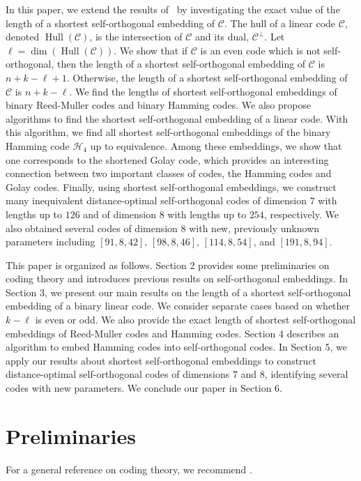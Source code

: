 \documentclass{article}
\theoremstyle{definition}
\theoremstyle{remark}
\newcommand{\Hull}{\operatorname{Hull}}
\begin{document}
In this paper, we extend the results of~\cite{Kim2022} by investigating the exact value of the length of a shortest self-orthogonal embedding of $\mathcal{C}$. The hull of a linear code $\mathcal{C}$, denoted $\Hull(\mathcal{C})$, is the intersection of $\mathcal{C}$ and its dual, $\mathcal{C}^\perp$.  Let $\ell = \dim(\Hull(\mathcal{C}))$.  We show that if $\mathcal{C}$ is an even code which is not self-orthogonal, then the length of a shortest self-orthogonal embedding of $\mathcal{C}$ is $n+k-\ell+1$. Otherwise, the length of a shortest self-orthogonal embedding of $\mathcal{C}$ is $n+k-\ell$. We find the lengths of shortest self-orthogonal embeddings of binary Reed-Muller codes and binary Hamming codes. We also propose algorithms to find the shortest self-orthogonal embedding of a linear code. With this algorithm, we find all shortest self-orthogonal embeddings of the binary Hamming code $\mathcal{H}_4$ up to equivalence. Among these embeddings, we show that one corresponds to the shortened Golay code, which provides an interesting connection between two important classes of codes, the Hamming codes and Golay codes. Finally, using shortest self-orthogonal embeddings, we construct many inequivalent distance-optimal self-orthogonal codes of dimension $7$ with lengths up to $126$ and of dimension $8$ with lengths up to $254$, respectively. We also obtained several codes of dimension $8$ with new, previously unknown parameters including $[91, 8, 42],\, [98, 8, 46],\,[114, 8, 54]$, and $[191, 8, 94]$.

This paper is organized as follows. Section 2 provides some preliminaries on coding theory and introduces previous results on self-orthogonal embeddings. In Section 3, we present our main results on the length of a shortest self-orthogonal embedding of a binary linear code. We consider separate cases based on whether $k-\ell$ is even or odd. We also provide the exact length of shortest self-orthogonal embeddings of Reed-Muller codes and Hamming codes. Section 4 describes an algorithm to embed Hamming codes into self-orthogonal codes. In Section 5, we apply our results about shortest self-orthogonal embeddings to construct distance-optimal self-orthogonal codes of dimensions $7$ and $8$, identifying several codes with new parameters. We conclude our paper in Section 6.

\section{Preliminaries}\label{sec:prelim}
For a general reference on coding theory, we recommend \cite{Pless1998, Macwilliams1977, Huffman2003}.
\end{document}
